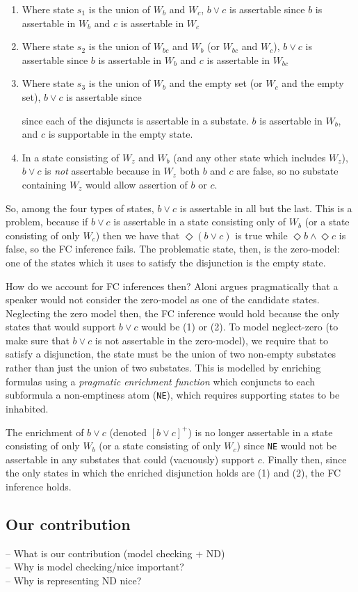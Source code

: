 \begin{enumerate}
\item Where state $s_1$ is the union of $W_b$ and $W_c$, $b\vee c$ is assertable since $b$ is assertable in $W_b$ and $c$ is assertable in $W_c$
\item Where state $s_2$ is the union of $W_{bc}$ and $W_b$ (or $W_{bc}$ and $W_c$), $b\vee c$ is assertable since $b$ is assertable in $W_b$ and $c$ is assertable in $W_{bc}$
\item Where state $s_3$ is the union of $W_b$ and the empty set (or $W_c$ and the empty set), $b\vee c$ is assertable since 


since each of the
disjuncts is assertable in a substate. $b$ is assertable in $W_b$, and $c$ is supportable in the empty state.
\item In a state consisting of $W_z$ and $W_b$ (and any other state which includes $W_z$), $b\vee c$ is
\textit{not} assertable because in $W_z$ both $b$ and $c$ are false, so no substate containing $W_z$ would allow assertion of $b$ or $c$.
\end{enumerate}

So, among the four types of states, $b\vee c$ is assertable in all but the last. This is a problem, because if
$b\vee c$ is assertable in a state consisting only of $W_b$ (or a state consisting of only $W_c$) then we have
that $\Diamond(b\vee c)$ is true while $\Diamond b \wedge \Diamond c$ is false, so the FC inference fails. The
problematic state, then, is the zero-model: one of the states which it uses to satisfy the disjunction is the
empty state.

How do we account for FC inferences then? Aloni argues pragmatically that a speaker would not consider the
zero-model as one of the candidate states. Neglecting the zero model then, the FC inference would hold
because the only states that would support $b\vee c$ would be (1) or (2). To model neglect-zero (to make
sure that $b\vee c$ is not assertable in the zero-model), we require that to satisfy a disjunction, the state
must be the union of two non-empty substates rather than just the union of two substates. 
This is modelled by enriching formulas using a \emph{pragmatic enrichment function} which conjuncts to each subformula a non-emptiness atom (\verb|NE|), which requires supporting states to be inhabited.

The enrichment of $b \vee c$ (denoted $[b\vee c]^+$) is no longer assertable in a state consisting of only $W_b$
(or a state consisting of only $W_c$) since \verb|NE| would not be assertable in any substates that could (vacuously) support $c$.
Finally then, since the only states in which the enriched disjunction holds are (1) and (2), the FC inference holds.

\subsection{Our contribution}
-- What is our contribution (model checking + ND)\\
-- Why is model checking/nice important?\\
-- Why is representing ND nice?